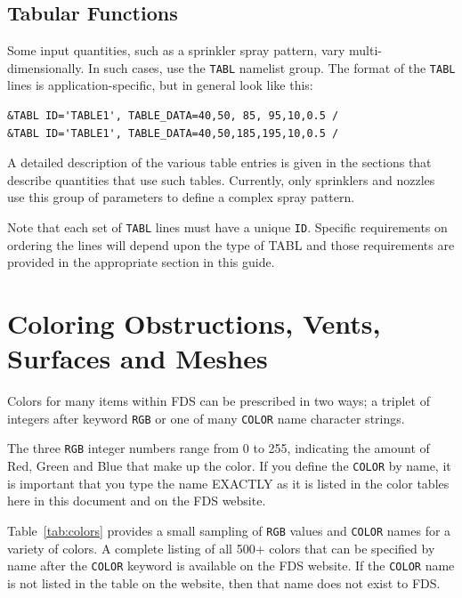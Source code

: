 \documentclass[11pt]{book}
\newcommand{\ct}{\tt\small}
\begin{document}
\subsection{Tabular Functions}

Some input quantities, such as a sprinkler spray pattern, vary multi-dimensionally. In such cases, use
the {\ct TABL} namelist group. The format of the {\ct TABL} lines is application-specific, but in general look like this:

\footnotesize
\begin{verbatim}
&TABL ID='TABLE1', TABLE_DATA=40,50, 85, 95,10,0.5 /
&TABL ID='TABLE1', TABLE_DATA=40,50,185,195,10,0.5 /
\end{verbatim}
\normalsize

\noindent
A detailed description of the various table entries is given in the sections that describe quantities that use such
tables. Currently, only sprinklers and nozzles use this group of parameters to define a complex spray pattern.

\begin{warning}
\noindent
Note that each set of {\ct TABL} lines must have a unique {\ct ID}.  Specific requirements on ordering the lines
will depend upon the type of TABL and those requirements are provided in the appropriate section in this guide.
\end{warning}


\clearpage

\section{Coloring Obstructions, Vents, Surfaces and Meshes}
\label{info:colors}
Colors for many items within FDS can be prescribed in two ways; a triplet of
integers after keyword {\ct RGB} or one of many {\ct COLOR} name character strings.

The three {\ct RGB} integer numbers range from 0 to 255, indicating the amount of Red, Green and Blue
that make up the color. If you define the {\ct COLOR} by name, it is important that you type the name EXACTLY as it
is listed in the color tables here in this document and on the FDS website.

Table~\ref{tab:colors} provides a small sampling of {\ct RGB} values and {\ct COLOR} names
for a variety of colors. A complete listing of all 500+ colors that can be
specified by name after the {\ct COLOR} keyword is available on the FDS website.
If the {\ct COLOR} name is not listed in the table on the website, then that name does not exist to FDS.
\end{document}
